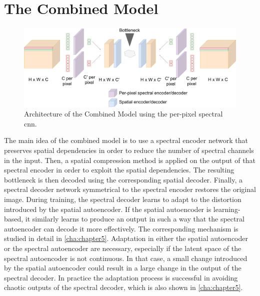 \section{The Combined Model\label{sec:combinedmodel}}
\begin{figure}
\centering
\includegraphics[scale=0.18]{img/GeneralArchitecture.pdf}
\caption[Combined model architecture]{Architecture of the Combined Model using the per-pixel spectral \ac{cnn}.}
\label{fig:combined}
\end{figure}

The main idea of the combined model is to use a spectral encoder network that preserves spatial dependencies in order to reduce the number of spectral channels in the input. Then, a spatial compression method is applied on the output of that spectral encoder in order to exploit the spatial dependencies. The resulting bottleneck is then decoded using the corresponding spatial decoder. Finally, a spectral decoder network symmetrical to the spectral encoder restores the original image. During training, the spectral decoder learns to adapt to the distortion introduced by the spatial autoencoder. If the spatial autoencoder is learning-based, it similarly learns to produce an output in such a way that the spectral autoencoder can decode it more effectively. The corresponding mechanism is studied in detail in \autoref{cha:chapter5}. Adaptation in either the spatial autoencoder or the spectral autoencoder are necessary, especially if the latent space of the spectral autoencoder is not continuous. In that case, a small change introduced by the spatial autoencoder could result in a large change in the output of the spectral decoder. In practice the adaptation process is successful in avoiding chaotic outputs of the spectral decoder, which is also shown in \autoref{cha:chapter5}.

